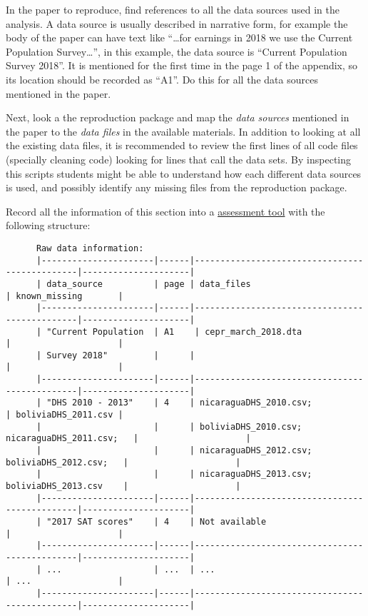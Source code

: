 \documentclass[]{book}
\begin{document}
In the paper to reproduce, find references to all the data sources used in the analysis. A data source is usually described in narrative form, for example the body of the paper can have text like ``\ldots{}for earnings in 2018 we use the Current Population Survey\ldots{}'', in this example, the data source is ``Current Population Survey 2018''. It is mentioned for the first time in the page 1 of the appendix, so its location should be recorded as ``A1''. Do this for all the data sources mentioned in the paper.

Next, look a the reproduction package and map the \emph{data sources} mentioned in the paper to the \emph{data files} in the available materials. In addition to looking at all the existing data files, it is recommended to review the first lines of all code files (specially cleaning code) looking for lines that call the data sets. By inspecting this scripts students might be able to understand how each different data sources is used, and possibly identify any missing files from the reproduction package.

Record all the information of this section into a \href{https://docs.google.com/spreadsheets/d/1LUIdVFH0OfR70C7z07TYeE-uWzKI_JIeWUMaYhqEKK0/edit\#gid=0\&range=A1}{assessment tool} with the following structure:

\begin{verbatim}
      Raw data information:
      |----------------------|------|-----------------------------------------------|---------------------|
      | data_source          | page | data_files                                    | known_missing       |
      |----------------------|------|-----------------------------------------------|---------------------|
      | "Current Population  | A1    | cepr_march_2018.dta                          |                     |
      | Survey 2018"         |      |                                               |                     |
      |----------------------|------|-----------------------------------------------|---------------------|
      | "DHS 2010 - 2013"    | 4    | nicaraguaDHS_2010.csv;                        | boliviaDHS_2011.csv |
      |                      |      | boliviaDHS_2010.csv; nicaraguaDHS_2011.csv;   |                     |
      |                      |      | nicaraguaDHS_2012.csv; boliviaDHS_2012.csv;   |                     |
      |                      |      | nicaraguaDHS_2013.csv; boliviaDHS_2013.csv    |                     |
      |----------------------|------|-----------------------------------------------|---------------------|
      | "2017 SAT scores"    | 4    | Not available                                 |                     |
      |----------------------|------|-----------------------------------------------|---------------------|
      | ...                  | ...  | ...                                           | ...                 |
      |----------------------|------|-----------------------------------------------|---------------------|
\end{verbatim}
\end{document}

